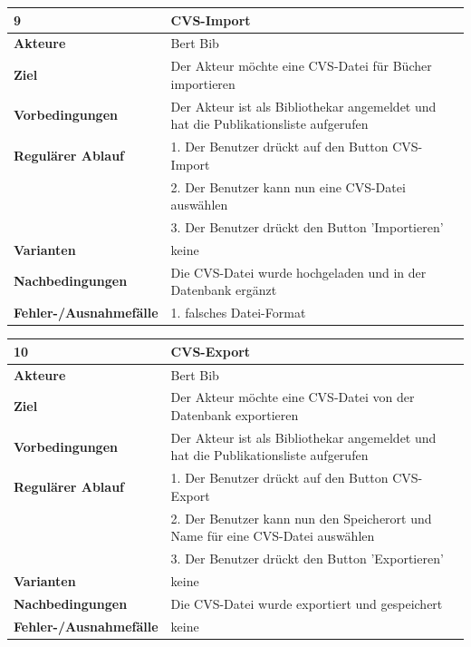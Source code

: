 \documentclass[fontsize=12pt,paper=a4,twoside]{scrartcl}
\begin{document}
\begin{table}[htbp]
\label{9}
\begin{tabular}{|l|p{10cm}|}
\hline 
\textbf{9} & \textbf{CVS-Import} \\ \hline
\textbf{Akteure} & Bert Bib\\ \hline
\textbf{Ziel} & Der Akteur möchte eine CVS-Datei für Bücher importieren \\ \hline
\textbf{Vorbedingungen} & Der Akteur ist als Bibliothekar angemeldet und hat die Publikationsliste aufgerufen \\ \hline
\textbf{Regulärer Ablauf} & 
1. Der Benutzer drückt auf den Button CVS-Import \\
&2. Der Benutzer kann nun eine CVS-Datei auswählen\\
&3. Der Benutzer drückt den Button 'Importieren'\\
\hline
\textbf{Varianten} & 
keine \\ \hline
\textbf{Nachbedingungen} & Die CVS-Datei wurde hochgeladen und in der Datenbank ergänzt\\ \hline
\textbf{Fehler-/Ausnahmefälle} & 1. falsches Datei-Format\\
\hline
\end{tabular}
\end{table}

\begin{table}[htbp]
\label{10}
\begin{tabular}{|l|p{10cm}|}
\hline 
\textbf{10} & \textbf{CVS-Export} \\ \hline
\textbf{Akteure} & Bert Bib\\ \hline
\textbf{Ziel} & Der Akteur möchte eine CVS-Datei von der Datenbank exportieren \\ \hline
\textbf{Vorbedingungen} & Der Akteur ist als Bibliothekar angemeldet und hat die Publikationsliste aufgerufen \\ \hline
\textbf{Regulärer Ablauf} & 
1. Der Benutzer drückt auf den Button CVS-Export \\
&2. Der Benutzer kann nun den Speicherort und Name für eine CVS-Datei auswählen\\
&3. Der Benutzer drückt den Button 'Exportieren'\\
\hline
\textbf{Varianten} & 
keine \\ \hline
\textbf{Nachbedingungen} & Die CVS-Datei wurde exportiert und gespeichert\\ \hline
\textbf{Fehler-/Ausnahmefälle} & keine\\
\hline
\end{tabular}
\end{table}
\end{document}
